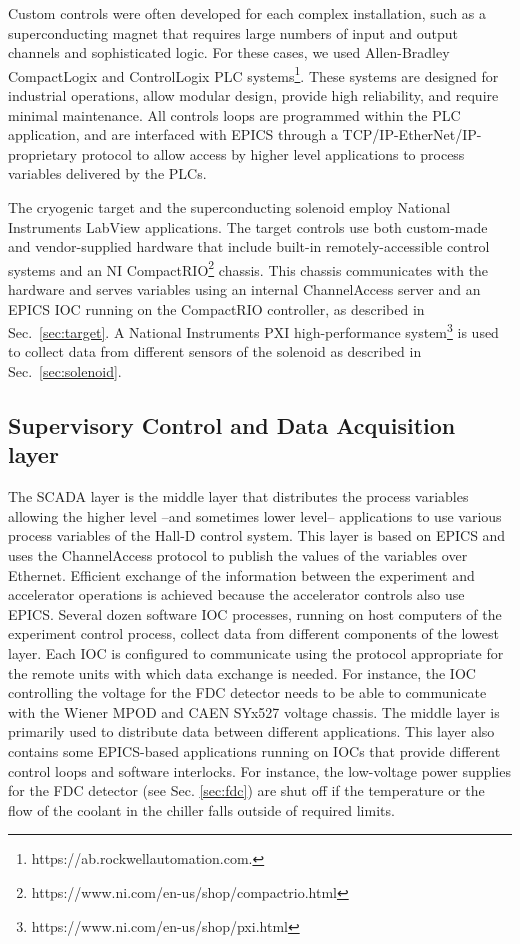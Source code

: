 Custom controls were often developed for each complex installation, such as a superconducting magnet that requires large numbers of input and output channels and sophisticated logic.
For these cases, we used Allen-Bradley CompactLogix and ControlLogix PLC systems\footnote{https://ab.rockwellautomation.com.}. These systems are designed for industrial operations, allow modular design, provide high reliability, and require minimal maintenance. All controls loops are programmed within the PLC application, and are interfaced with EPICS through a TCP/IP-EtherNet/IP-proprietary protocol to allow access by higher level applications to process variables delivered by the PLCs.  

The cryogenic target and the superconducting solenoid employ National Instruments LabView applications. The target controls use both custom-made and vendor-supplied hardware that include built-in remotely-accessible control systems and an NI CompactRIO\footnote{https://www.ni.com/en-us/shop/compactrio.html} chassis. This chassis communicates with the hardware and serves variables using an internal ChannelAccess server and an EPICS IOC running on the CompactRIO controller, as described in Sec.~\ref{sec:target}. A National Instruments PXI high-performance system\footnote{https://www.ni.com/en-us/shop/pxi.html} is used to collect data from different sensors of the solenoid as described in Sec.~\ref{sec:solenoid}. 

\subsection{Supervisory Control and Data Acquisition layer \label{sec:archiver}}
The SCADA layer is the middle layer that distributes the process variables allowing the higher level --and sometimes lower level-- applications to use various process variables of the Hall-D control system. This layer is based on EPICS and uses the ChannelAccess protocol to publish the values of the variables over Ethernet. Efficient exchange of the information between the experiment and accelerator operations is achieved because the accelerator controls also use EPICS.
Several dozen software IOC processes, running on host computers of the experiment control process, collect data from different components of the lowest layer. Each IOC is configured to communicate using the protocol appropriate for the remote units with which data exchange is needed. For instance, the IOC controlling the voltage for the FDC detector needs to be able to communicate with the Wiener MPOD and CAEN SYx527 voltage chassis. The middle layer is primarily used to distribute data between different applications. This layer also contains some EPICS-based applications running on IOCs that provide different control loops and software interlocks.  For instance, the low-voltage power supplies for the FDC detector (see Sec. \ref{sec:fdc}) are shut off if the temperature or the flow of the coolant in the chiller falls outside of required limits. 

